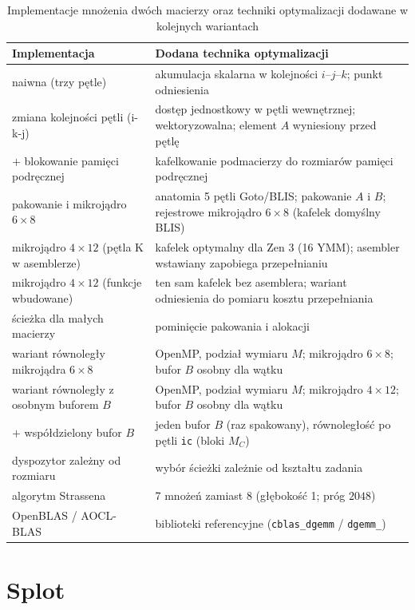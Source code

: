 \documentclass[a4paper,12pt]{book} %
\begin{document}
\begin{table}[t!]
\centering
\caption{Implementacje mnożenia dwóch macierzy oraz techniki optymalizacji dodawane w kolejnych wariantach}
\label{tab:gemm-impl}
\begin{tabular}{p{} p{}}
\hline
Implementacja & Dodana technika optymalizacji \\
\hline
naiwna (trzy pętle) & akumulacja skalarna w kolejności $i$--$j$--$k$; punkt odniesienia \\
zmiana kolejności pętli (i-k-j) & dostęp jednostkowy w pętli wewnętrznej; wektoryzowalna; element $A$ wyniesiony przed pętlę \\
$+$ blokowanie pamięci podręcznej & kafelkowanie podmacierzy do rozmiarów pamięci podręcznej \\
pakowanie i mikrojądro $6 \times 8$ & anatomia 5 pętli Goto/BLIS; pakowanie $A$ i $B$; rejestrowe mikrojądro $6 \times 8$ (kafelek domyślny BLIS) \\
mikrojądro $4 \times 12$ (pętla K w asemblerze) & kafelek optymalny dla Zen 3 (16 YMM); asembler wstawiany zapobiega przepełnianiu\\
mikrojądro $4 \times 12$ (funkcje wbudowane) & ten sam kafelek bez asemblera; wariant odniesienia do pomiaru kosztu przepełniania\\
ścieżka dla małych macierzy & pominięcie pakowania i alokacji \\
wariant równoległy mikrojądra $6 \times 8$ & OpenMP, podział wymiaru $M$; mikrojądro $6 \times 8$; bufor $B$ osobny dla wątku \\
wariant równoległy z osobnym buforem $B$ & OpenMP, podział wymiaru $M$; mikrojądro $4 \times 12$; bufor $B$ osobny dla wątku \\
$+$ współdzielony bufor $B$ & jeden bufor $B$ (raz spakowany), równoległość po pętli \texttt{ic} (bloki $M_C$) \\
dyspozytor zależny od rozmiaru & wybór ścieżki zależnie od kształtu zadania \\
algorytm Strassena & 7 mnożeń zamiast 8 (głębokość 1; próg $2048$) \\
OpenBLAS / AOCL-BLAS & biblioteki referencyjne (\texttt{cblas\_dgemm} / \texttt{dgemm\_}) \\
\hline
\end{tabular}
\end{table}

\section{Splot}
\label{sec:impl-conv}
\end{document}
